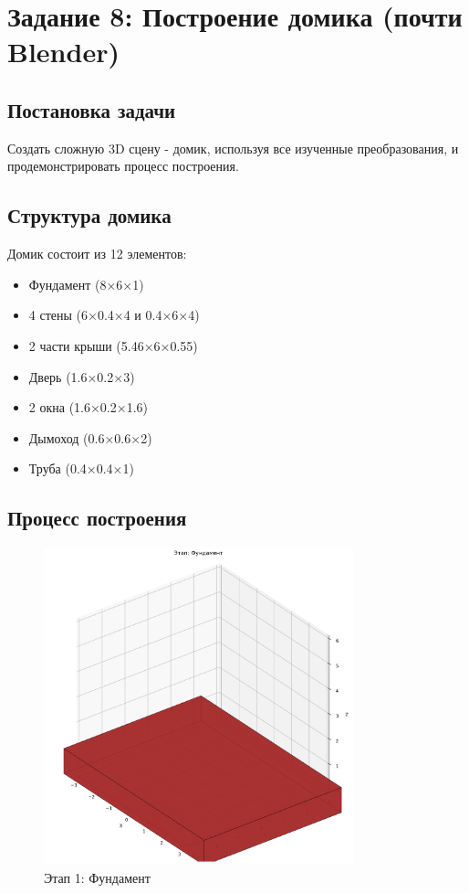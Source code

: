 \section*{Задание 8: Построение домика (почти Blender)}

\subsection*{Постановка задачи}
Создать сложную 3D сцену - домик, используя все изученные преобразования, и продемонстрировать процесс построения.

\subsection*{Структура домика}
Домик состоит из 12 элементов:
\begin{itemize}
    \item Фундамент (8×6×1)
    \item 4 стены (6×0.4×4 и 0.4×6×4)
    \item 2 части крыши (5.46×6×0.55)
    \item Дверь (1.6×0.2×3)
    \item 2 окна (1.6×0.2×1.6)
    \item Дымоход (0.6×0.6×2)
    \item Труба (0.4×0.4×1)
\end{itemize}

\subsection*{Процесс построения}

\begin{figure}[H]
\centering
\includegraphics[width=0.8\textwidth]{images/task8/construction_фундамент.png}
\caption{Этап 1: Фундамент}
\end{figure}

